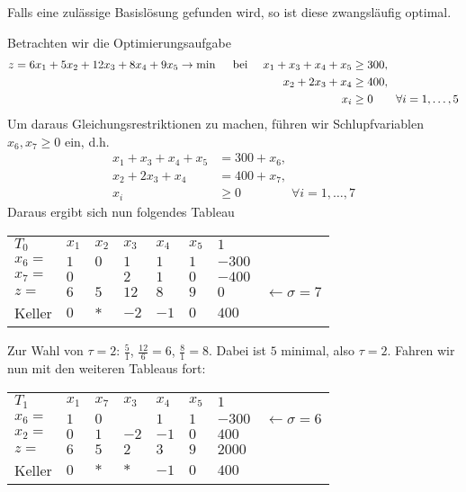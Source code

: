 \begin{bemerkung} %
	Falls eine zulässige Basislösung gefunden wird, so ist diese zwangsläufig optimal.
\end{bemerkung}

\begin{beispiel}
	Betrachten wir die Optimierungsaufgabe
	\begin{equation*}
		\begin{aligned}
			z = 6x_1 + 5x_2 + 12x_3 + 8x_4 + 9x_5 \to \min \quad \text{ bei } \quad 
			x_1 + x_3 + x_4 + x_5 &\ge 300, \\
			x_2 + 2x_3 + x_4 &\ge 400, \\
			x_i &\ge 0 \qquad \forall i = 1, \dots, 5
		\end{aligned}
	\end{equation*}
	Um daraus Gleichungsrestriktionen zu machen, führen wir Schlupfvariablen $x_6, x_7 \ge 0$ ein, d.h.
	\begin{equation*}
		\begin{aligned}
			x_1 + x_3 + x_4 + x_5 &= 300 + x_6 , \\
			x_2 + 2x_3 + x_4 &= 400 + x_7, \\
			x_i &\ge 0 \qquad \qquad \forall i = 1, \dots, 7
		\end{aligned}
	\end{equation*}
	Daraus ergibt sich nun folgendes Tableau
	\begin{indentpar}
		\begin{tabular}{R{1cm}|R{.5cm}R{.5cm}R{.5cm}R{.5cm}R{.5cm}|R{.9cm}l}
			$T_0$ & $x_1$ & $x_2$ & $x_3$ & $x_4$ & $x_5$ & $1$ \\ 
			$x_6 =$ & $1$ & $0$ & $1$ & $1$ & $1$ & $-300$ \\
			$x_7 =$ & $0$ &  & $2$ & $1$ & $0$ & $-400$ \\ 
			$z =$   & $6$ & $5$ & $12$ & $8$ & $9$ & $0$ & $\leftarrow \sigma = 7$ \\ 
			Keller  & $0$ & $\ast$ & $-2$ & $-1$ & $0$ & $400$
		\end{tabular}
	\end{indentpar}
	
	Zur Wahl von $\tau = 2$: $\frac{5}{1}$, $\frac{12}{6} = 6$, $\frac{8}{1} = 8$. Dabei ist $5$ minimal, also $\tau = 2$.
	Fahren wir nun mit den weiteren Tableaus fort:
	
	\begin{indentpar}
		\begin{tabular}{R{1cm}|R{.5cm}R{.5cm}R{.5cm}R{.5cm}R{.5cm}|R{.9cm}l}
			$T_1$   & $x_1$ & $x_7$  & $x_3$      & $x_4$ & $x_5$ & $1$ \\ \cline{1-7}
			$x_6 =$ & $1$   & $0$    &  & $1$   & $1$   & $-300$ & $\leftarrow \sigma = 6$ \\
			$x_2 =$ & $0$   & $1$    & $-2$       & $-1$  & $0$   & $400$ \\ \cline{1-7}
			$z =$   & $6$   & $5$    & $2$        & $3$   & $9$   & $2000$ \\ \cline{1-7}
			Keller  & $0$   & $\ast$ & $\ast$ & $-1$  & $0$   & $400$
		\end{tabular}


\end{indentpar}
\end{beispiel}
